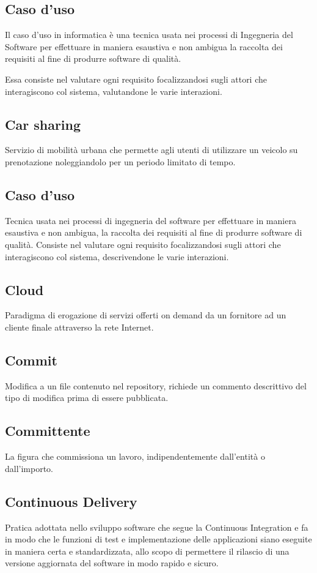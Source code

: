 \subsection*{Caso d'uso}
Il caso d'uso in informatica è una tecnica usata nei processi di Ingegneria del Software per effettuare in maniera esaustiva e non ambigua la raccolta dei requisiti al fine di produrre software di qualità.

Essa consiste nel valutare ogni requisito focalizzandosi sugli attori che interagiscono col sistema, valutandone le varie interazioni. 

\subsection*{Car sharing} Servizio di mobilità urbana che permette agli utenti di utilizzare un veicolo su prenotazione noleggiandolo per un periodo limitato di tempo.
\subsection*{Caso d'uso} Tecnica usata nei processi di ingegneria del software per effettuare in maniera esaustiva e non ambigua, la raccolta dei requisiti al fine di produrre software di qualità. Consiste nel valutare ogni requisito focalizzandosi sugli attori che interagiscono col sistema, descrivendone le varie interazioni.
\subsection*{Cloud} Paradigma di erogazione di servizi offerti on demand da un fornitore ad un cliente finale attraverso la rete Internet.
\subsection*{Commit} Modifica a un file contenuto nel repository, richiede un commento descrittivo del tipo di modifica prima di essere pubblicata.
\subsection*{Committente} La figura che commissiona un lavoro, indipendentemente dall'entità o dall'importo.
\subsection*{Continuous Delivery} Pratica adottata nello sviluppo software che segue la Continuous Integration e fa in modo che le funzioni di test e implementazione delle applicazioni siano eseguite in maniera certa e standardizzata, allo scopo di permettere il rilascio di una versione aggiornata del software in modo rapido e sicuro.
